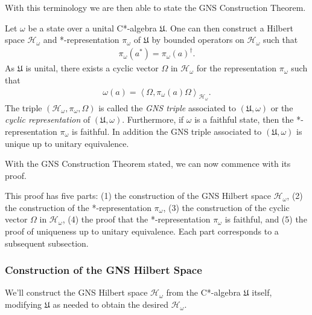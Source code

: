 With this terminology we are then able to state the GNS Construction Theorem.

\begin{theorem}
    \label{thrm:gns-construction-theorem}
    \leanok
    Let $\omega$ be a state over a unital C*-algebra $\mathfrak{U}$. One can then construct a Hilbert space $\mathcal{H}_\omega$ and *-representation $\pi_\omega$ of $\mathfrak{U}$ by bounded operators on $\mathcal{H}_\omega$ such that
    \begin{align}
        \pi_\omega(a^*) = \pi_\omega(a)^\dagger.
    \end{align}
    As $\mathfrak{U}$ is unital, there exists a cyclic vector $\Omega$ in $\mathcal{H}_\omega$ for the representation $\pi_\omega$ such that
    \begin{align}
        \omega(a) = \left<\Omega, \pi_\omega(a)\Omega\right>_{\mathcal{H}_\omega}.
    \end{align}
    The triple $(\mathcal{H}_\omega, \pi_\omega, \Omega)$ is called the \textit{GNS triple} associated to $(\mathfrak{U}, \omega)$ or the \textit{cyclic representation} of $(\mathfrak{U}, \omega)$. Furthermore, if $\omega$ is a faithful state, then the *-representation $\pi_\omega$ is faithful. In addition the GNS triple associated to $(\mathfrak{U}, \omega)$ is unique up to unitary equivalence.
\end{theorem}

With the GNS Construction Theorem stated, we can now commence with its proof.

This proof has five parts: (1) the construction of the GNS Hilbert space $\mathcal{H}_\omega$, (2) the construction of the *-representation $\pi_\omega$, (3) the construction of the cyclic vector $\Omega$ in $\mathcal{H}_\omega$, (4) the proof that the *-representation $\pi_\omega$ is faithful, and (5) the proof of uniqueness up to unitary equivalence. Each part corresponds to a subsequent subsection.

\subsubsection{Construction of the GNS Hilbert Space}
We'll construct the GNS Hilbert space $\mathcal{H}_\omega$ from the C*-algebra $\mathfrak{U}$ itself, modifying $\mathfrak{U}$ as needed to obtain the desired $\mathcal{H}_\omega$.

